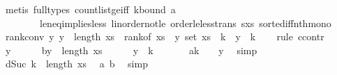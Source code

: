 \begin{isabellebody}
\ {\isacharparenleft}{\kern0pt}metis\ {\isacharparenleft}{\kern0pt}full{\isacharunderscore}{\kern0pt}types{\isacharparenright}{\kern0pt}\ count{\isacharunderscore}{\kern0pt}list{\isacharunderscore}{\kern0pt}ge{\isacharunderscore}{\kern0pt}{}{\isacharunderscore}{\kern0pt}iff\ k{\isacharunderscore}{\kern0pt}bound\ a{\isacharunderscore}{\kern0pt}{}\ \isanewline
\ \ \ \ \ \ \ \ le{\isacharunderscore}{\kern0pt}neq{\isacharunderscore}{\kern0pt}implies{\isacharunderscore}{\kern0pt}less\ linorder{\isacharunderscore}{\kern0pt}not{\isacharunderscore}{\kern0pt}le\ order{\isacharunderscore}{\kern0pt}le{\isacharunderscore}{\kern0pt}less{\isacharunderscore}{\kern0pt}trans\ s{\isacharunderscore}{\kern0pt}xs\ sorted{\isacharunderscore}{\kern0pt}iff{\isacharunderscore}{\kern0pt}nth{\isacharunderscore}{\kern0pt}mono{\isacharparenright}{\kern0pt}\isanewline
\isanewline
\ \ \isamarkupfalse%
\ rank{\isacharunderscore}{\kern0pt}conv{\isacharunderscore}{\kern0pt}{}{\isacharcolon}{\kern0pt}\ {\isachardoublequoteopen}{\isasymAnd}y{\isachardot}{\kern0pt}\ y\ {\isacharless}{\kern0pt}\ length\ xs\ {\isasymLongrightarrow}\ rank{\isacharunderscore}{\kern0pt}of\ {\isacharparenleft}{\kern0pt}xs\ {\isacharbang}{\kern0pt}\ y{\isacharparenright}{\kern0pt}\ {\isacharparenleft}{\kern0pt}set\ xs{\isacharparenright}{\kern0pt}\ {\isacharless}{\kern0pt}\ k{\isacharplus}{\kern0pt}{}\ {\isasymLongrightarrow}\ y\ {\isacharless}{\kern0pt}\ k{\isacharplus}{\kern0pt}{}{\isachardoublequoteclose}\isanewline
\ \ \isamarkupfalse%
\ {\isacharparenleft}{\kern0pt}rule\ ccontr{\isacharparenright}{\kern0pt}\isanewline
\ \ \ \ \isamarkupfalse%
\ y\isanewline
\ \ \ \ \isamarkupfalse%
\ b{\isacharcolon}{\kern0pt}{\isachardoublequoteopen}y\ {\isacharless}{\kern0pt}\ length\ xs{\isachardoublequoteclose}\isanewline
\ \ \ \ \isamarkupfalse%
\ {\isachardoublequoteopen}{\isasymnot}y\ {\isacharless}{\kern0pt}\ k\ {\isacharplus}{\kern0pt}{}{\isachardoublequoteclose}\isanewline
\ \ \ \ \isamarkupfalse%
\ a{\isacharcolon}{\kern0pt}{\isachardoublequoteopen}k\ {\isacharplus}{\kern0pt}\ {}\ {\isasymle}\ y{\isachardoublequoteclose}\ \isamarkupfalse%
\ simp\isanewline
\isanewline
\ \ \ \ \isamarkupfalse%
\ d{\isacharcolon}{\kern0pt}{\isachardoublequoteopen}Suc\ k\ {\isacharless}{\kern0pt}\ length\ xs{\isachardoublequoteclose}\ \isamarkupfalse%
\ a\ b\ \isamarkupfalse%
\ simp\isanewline

\end{isabellebody}
